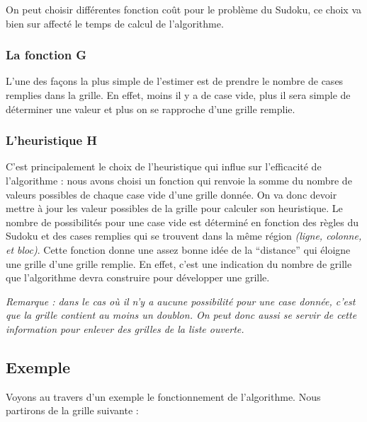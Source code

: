             On peut choisir différentes fonction coût pour le problème du Sudoku, ce choix va bien sur affecté le temps de calcul de l'algorithme.
            \subsubsection*{La fonction G}
            
                L'une des façons la plus simple de l'estimer est de prendre le nombre de cases remplies dans la grille. En effet, moins il y a de case vide, plus il sera simple de déterminer une valeur et plus on se rapproche d'une grille remplie.
                
            \subsubsection*{L'heuristique H}
            

 
 	C'est principalement le choix de l'heuristique qui influe sur l'efficacité de l'algorithme : nous avons choisi un fonction qui renvoie la somme du nombre de valeurs possibles de chaque case vide d'une grille donnée. On va donc devoir mettre à jour les valeur possibles de la grille pour calculer son heuristique.
 	Le nombre de possibilités pour une case vide est déterminé en fonction des règles du Sudoku et des cases remplies qui se trouvent dans la même région \textit{(ligne, colonne, et bloc)}.
 	Cette fonction donne une assez bonne idée de la ``distance'' qui éloigne une grille d'une grille remplie. En effet, c'est une indication du nombre de grille que l'algorithme devra construire pour développer une grille. 

               \textit{Remarque : dans le cas où il n'y a aucune possibilité pour une case donnée, c'est que la grille contient au moins un doublon. On peut donc aussi se servir de cette information pour enlever des grilles de la liste ouverte.}
 

	    \subsection{Exemple}




Voyons au travers d'un exemple le fonctionnement de l'algorithme. Nous partirons de la grille suivante :

